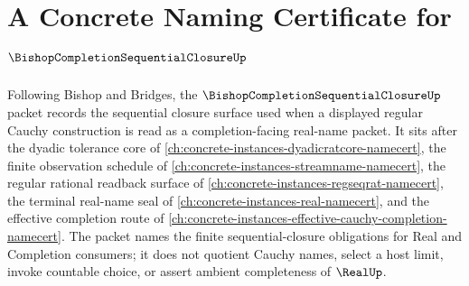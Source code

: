 \chapter{A Concrete Naming Certificate for $\BishopCompletionSequentialClosureUp$}
\label{ch:concrete-instances-bishop-completion-sequential-closure-namecert}

Following Bishop and Bridges, the $\BishopCompletionSequentialClosureUp$ packet records the sequential closure surface used when a displayed regular Cauchy construction is read as a completion-facing real-name packet. It sits after the dyadic tolerance core of \autoref{ch:concrete-instances-dyadicratcore-namecert}, the finite observation schedule of \autoref{ch:concrete-instances-streamname-namecert}, the regular rational readback surface of \autoref{ch:concrete-instances-regseqrat-namecert}, the terminal real-name seal of \autoref{ch:concrete-instances-real-namecert}, and the effective completion route of \autoref{ch:concrete-instances-effective-cauchy-completion-namecert}. The packet names the finite sequential-closure obligations for Real and Completion consumers; it does not quotient Cauchy names, select a host limit, invoke countable choice, or assert ambient completeness of $\RealUp$.

